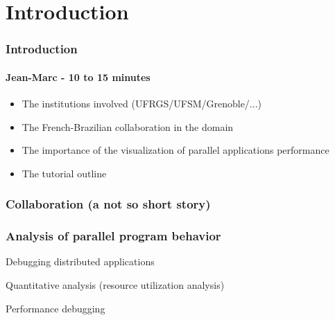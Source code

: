 \section{Introduction}

\frame
{
  \frametitle{Introduction}
  \framesubtitle{Jean-Marc - 10 to 15 minutes}

  \begin{itemize}
  \item The institutions involved (UFRGS/UFSM/Grenoble/...)
  \item The French-Brazilian collaboration in the domain
  \item The importance of the visualization of parallel applications performance
  \item The tutorial outline
  \end{itemize}
}
\begin{frame}

\frametitle{Collaboration (a not so short story)}
\end{frame}


\begin{frame}
\frametitle{Analysis of parallel program behavior}
\begin{description}
\item Debugging distributed applications
\item Quantitative analysis (resource utilization analysis) 
\item Performance debugging
\end{description}
\end{frame}

